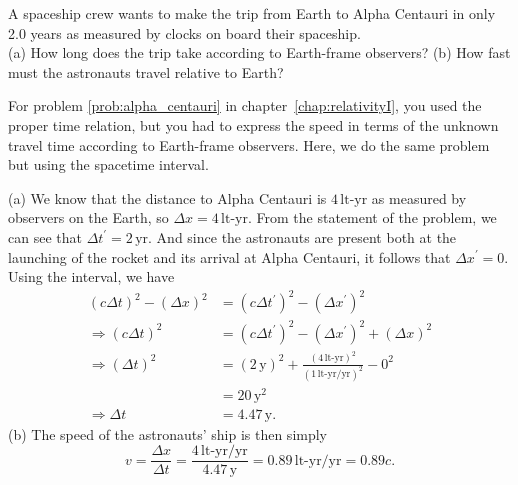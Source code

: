 \begin{example} 
  A spaceship crew wants to make the trip from Earth to Alpha Centauri
  in only 2.0 years as measured by clocks on board their spaceship.\\
  (a) How long does the trip take according to Earth-frame observers?
  (b) How fast must the astronauts travel relative to Earth?
  

\solution For problem \ref{prob:alpha_centauri} in
  chapter~\ref{chap:relativityI}, you used the proper time relation,
  but you had to express the speed in terms of the unknown travel time
  according to Earth-frame observers.  Here, we do the same problem
  but using the spacetime interval.

   (a) We know that the distance to Alpha Centauri is 
  $4\,\text{lt-yr}$ as measured by observers on the Earth, so $\Delta x =
  4\,\text{lt-yr}$.  From the statement of the problem, we can see that
  $\Delta t^\prime = 2\,\text{yr}$.  And since the astronauts are
  present both at the launching of the rocket and its arrival at Alpha
  Centauri, it follows that $\Delta x^\prime = 0$.  Using the
  interval, we have
\begin{align}
\left(c\Delta t\right)^2 - \left(\Delta x\right)^2 &= 
   \left(c\Delta t^\prime\right)^2 -\left(\Delta x^\prime\right)^2  \\
\Rightarrow \left(c\Delta t\right)^2 &= \left(c\Delta t^\prime\right)^2 - 
     \left(\Delta x^\prime\right)^2 + \left(\Delta x\right)^2  \\
\Rightarrow \left(\Delta t\right)^2 &= (2\,\text{y})^2 + 
                         \frac{(4\,\text{lt-yr})^2}{(1\,\text{lt-yr/yr})^2} - 0^2
                                                           \\
                                  &= 20\,\text{y}^2     \\
\Rightarrow \Delta t &= 4.47\,\text{y}. 
\end{align}
(b) The speed of the astronauts' ship is then simply
\begin{equation}
  v = \frac{\Delta x}{\Delta t} =
  \frac{4\,\text{lt-yr/yr}}{4.47\,\text{y}}  
   = 0.89\,\text{lt-yr/yr} = 0.89c.
\end{equation}
\label{example:intervals-causality}
\end{example}


